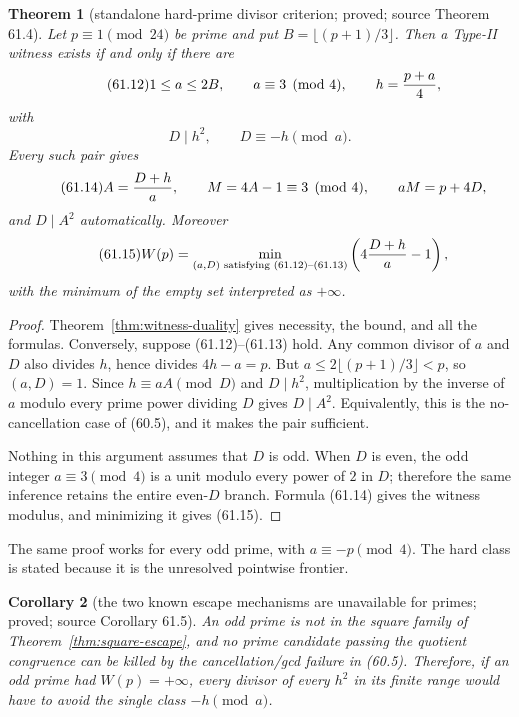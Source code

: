 \documentclass[10pt,reqno]{amsart}
\newtheorem{theorem}{Theorem}[section]
\newtheorem{corollary}[theorem]{Corollary}
\theoremstyle{definition}
\newcommand{\1}{\mathbf 1}
\begin{document}
\begin{theorem}[standalone hard-prime divisor criterion; proved; source
Theorem 61.4]
\label{thm:hard-prime-criterion}
Let $p\equiv1\pmod {24}$ be prime and put
$B=\lfloor(p+1)/3\rfloor$.  Then a Type-II witness exists if and only if
there are
\begin{equation}\tag{61.12}
 1\leq a\leq2B,\qquad a\equiv3\pmod4,
 \qquad h={p+a\over4},
\end{equation}
with
\begin{equation}\tag{61.13}
 D\mid h^2,
 \qquad D\equiv-h\pmod a.
\end{equation}
Every such pair gives
\begin{equation}\tag{61.14}
 A={D+h\over a},\qquad M=4A-1\equiv3\pmod4,
 \qquad aM=p+4D,
\end{equation}
and $D\mid A^2$ automatically.  Moreover
\begin{equation}\tag{61.15}
 W(p)=\min_{(a,D)\text{ satisfying }(61.12)\text{--}(61.13)}
              \left(4{D+h\over a}-1\right),
\end{equation}
with the minimum of the empty set interpreted as $+\infty$.
\end{theorem}
\begin{proof}
Theorem~\ref{thm:witness-duality} gives necessity, the bound, and all the
formulas.  Conversely, suppose (61.12)--(61.13) hold.  Any common divisor of
$a$ and $D$ also divides $h$, hence divides $4h-a=p$.  But
$a\leq2\lfloor(p+1)/3\rfloor<p$, so $(a,D)=1$.  Since
$h\equiv aA\pmod D$ and $D\mid h^2$, multiplication by the inverse of $a$
modulo every prime power dividing $D$ gives $D\mid A^2$.  Equivalently,
this is the no-cancellation case of (60.5), and it makes the pair sufficient.

Nothing in this argument assumes that $D$ is odd.  When $D$ is even, the
odd integer $a\equiv3\pmod4$ is a unit modulo every power of $2$ in $D$;
therefore the same inference retains the entire even-$D$ branch.  Formula
(61.14) gives the witness modulus, and minimizing it gives (61.15).
\end{proof}
The same proof works for every odd prime, with
$a\equiv-p\pmod4$.  The hard class is stated because it is the unresolved
pointwise frontier.

\begin{corollary}[the two known escape mechanisms are unavailable for
primes; proved; source Corollary 61.5]
\label{cor:prime-third-mechanism}
An odd prime is not in the square family of
Theorem~\ref{thm:square-escape}, and no prime candidate passing the quotient
congruence can be killed by the cancellation/gcd failure in (60.5).
Therefore, if an odd prime had $W(p)=+\infty$, every divisor of every $h^2$
in its finite range would have to avoid the single class $-h\pmod a$.
\end{corollary}
\end{document}
